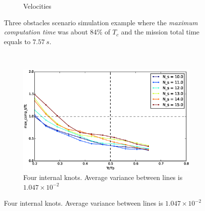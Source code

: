 \begin{figure}[!h]
\begin{subfigure}[b]{0.48\textwidth}
                \caption{Velocities}\label{fig:rinput}
        \end{subfigure}
        \caption{Three obstacles scenario simulation example where the \textit{maximum computation time} was about 84\% of $T_c$ and the mission total time equals to $7.57\ s$.}\label{fig:r3}
\end{figure}

\begin{figure}[!h]
        \centering
        ~ %
        \begin{subfigure}[b]{0.48\textwidth}
                \includegraphics[width=\textwidth]{./images/realtime/Scenario_3__N_knots_4/mcttc-tctp.eps}
                \caption{Four internal knots. Average variance between lines is $1.047\times 10^{-2}$}\label{fig:uni34}
        \end{subfigure}
        

\end{figure}
